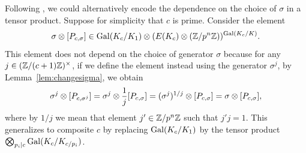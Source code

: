 \documentclass{article} \usepackage[active]{srcltx}
\begin{document}




\begin{remark}\label{rem:tensorgalois}
  Following \cite[\S1.2]{howard:kolyvagin}, we could alternatively
  encode the dependence on the choice of $\sigma$ in a tensor product.  Suppose
  for simplicity that $c$ is prime.  Consider the element
  $$
  \sigma \otimes [P_{c,\sigma}] \in \operatorname{Gal}(K_c/K_1) \otimes (E(K_c)\otimes (\mathbb{Z}/p^n\mathbb{Z}))^{\operatorname{Gal}(K_c/K)}.
  $$ 
  This element does not depend on the choice of generator $\sigma$
  because for any $j\in (\mathbb{Z}/(c+1)\mathbb{Z})^{\times}$, if we define the
  element instead using the generator $\sigma^j$, by
  Lemma~\ref{lem:changesigma}, we obtain
  $$
  \sigma^j \otimes [P_{c,\sigma^j}] = \sigma^j \otimes \frac{1}{j}
  [P_{c,\sigma}] = (\sigma^j)^{1/j} \otimes [P_{c,\sigma}] = \sigma
  \otimes [P_{c,\sigma}],
  $$
  where by $1/j$ we mean that element $j'\in \mathbb{Z}/p^n\mathbb{Z}$ such that $j'j
  = 1$.  This generalizes to composite $c$ by replacing
  $\operatorname{Gal}(K_c/K_1)$ by the tensor product $\bigotimes_{p_i \mid c}
  \operatorname{Gal}(K_c/K_{c/p_i})$.
\end{remark}
\end{document}
